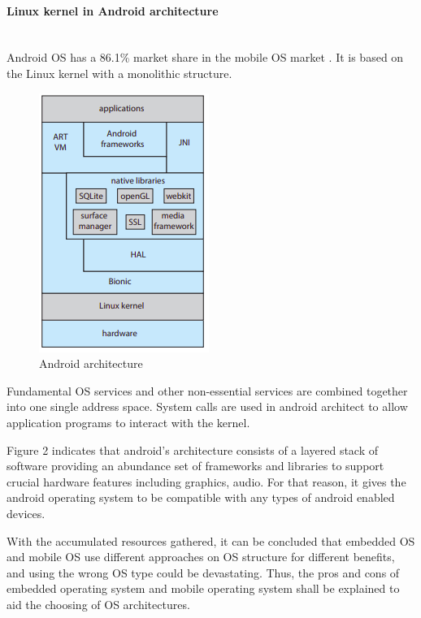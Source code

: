 \documentclass[conference]{IEEEtran}
\newcommand{\forceindent}{\leavevmode{\parindent=1em\indent}}
\begin{document}
\medskip
\paragraph{Linux kernel in Android architecture} \mbox{} \\
\forceindent Android OS has a 86.1\% market share in the mobile OS market \cite{SMS}. It is based on the Linux kernel with a monolithic structure.

\begin{figure}[h]
  \caption{Android architecture}
\begin{center}
\includegraphics[scale=0.7]{./images/Android_architecture.png}
\end{center}
\end{figure}

\smallskip
\forceindent Fundamental OS services and other non-essential services are combined together into one single address space\cite{Galvinbook}. System calls are used in android architect to allow application programs to interact with the kernel\cite{TDDBM}.

\smallskip
\forceindent Figure 2 indicates that android’s architecture consists of a layered stack of software providing an abundance set of frameworks and libraries to support crucial hardware features including graphics, audio\cite{Galvinbook}. For that reason, it gives the android operating system to be compatible with any types of android enabled devices.

\smallskip
\forceindent With the accumulated resources gathered, it can be concluded that embedded OS and mobile OS use different approaches on OS structure for different benefits, and using the wrong OS type could be devastating. Thus, the pros and cons of embedded operating system and mobile operating system shall be explained to aid the choosing of OS architectures.
\end{document}
